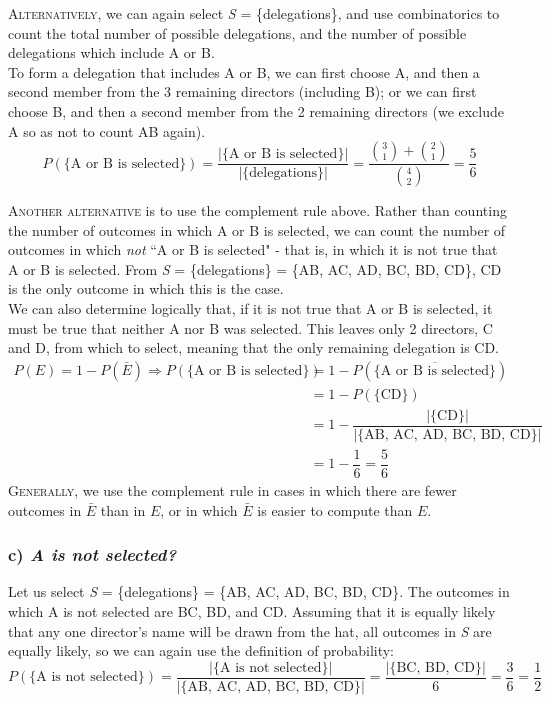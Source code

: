 \documentclass{article}
\begin{document}
\textsc{Alternatively}, we can again select \textsl{S} = \{delegations\}, and use combinatorics to count the total number of possible delegations, and the number of possible delegations which include A or B.\\[1ex]
To form a delegation that includes A or B, we can first choose A, and then a second member from the 3 remaining directors (including B); or we can first choose B, and then a second member from the 2 remaining directors (we exclude A so as not to count AB again).
\begin{equation*}
P(\{\text{A or B is selected}\})=\dfrac{|\{\text{A or B is selected}\}|}{|\{\text{delegations}\}|}=\dfrac{\binom{3}{1}+\binom{2}{1}}{\binom{4}{2}}=\dfrac{5}{6}
\end{equation*}

\textsc{Another alternative} is to use the complement rule above. Rather than counting the number of outcomes in which A or B is selected, we can count the number of outcomes in which \textit{not} ``A or B is selected" - that is, in which it is not true that A or B is selected. From \textsl{S} = \{delegations\} = \{AB, AC, AD, BC, BD, CD\}, CD is the only outcome in which this is the case.\\[1ex]
We can also determine logically that, if it is not true that A or B is selected, it must be true that neither A nor B was selected. This leaves only 2 directors, C and D, from which to select, meaning that the only remaining delegation is CD.
\begin{align*}
P(E)=1-P(\bar{E})\Rightarrow P(\{\text{A or B is selected}\})& =1-P(\{\overline{\text{A or B is selected}}\})\\
& =1-P(\{\text{CD}\})\\
& =1-\dfrac{|\{\text{CD}\}|}{|\{\text{AB, AC, AD, BC, BD, CD}\}|}\\
& =1-\dfrac{1}{6}=\dfrac{5}{6}
\end{align*}
\textsc{Generally}, we use the complement rule in cases in which there are fewer outcomes in $\bar{E}$ than in $E$, or in which $\bar{E}$ is easier to compute than $E$.

\subsubsection*{c) {\em A is not selected?}}
Let us select \textsl{S} = \{delegations\} = \{AB, AC, AD, BC, BD, CD\}. The outcomes in which A is not selected are BC, BD, and CD. Assuming that it is equally likely that any one director's name will be drawn from the hat, all outcomes in \textsl{S} are equally likely, so we can again use the definition of probability:
\begin{equation*}
P(\{\text{A is not selected}\})=\dfrac{|\{\text{A is not selected}\}|}{|\{\text{AB, AC, AD, BC, BD, CD}\}|}=\dfrac{|\{\text{BC, BD, CD}\}|}{6}=\dfrac{3}{6}=\dfrac{1}{2}
\end{equation*}
\end{document}
